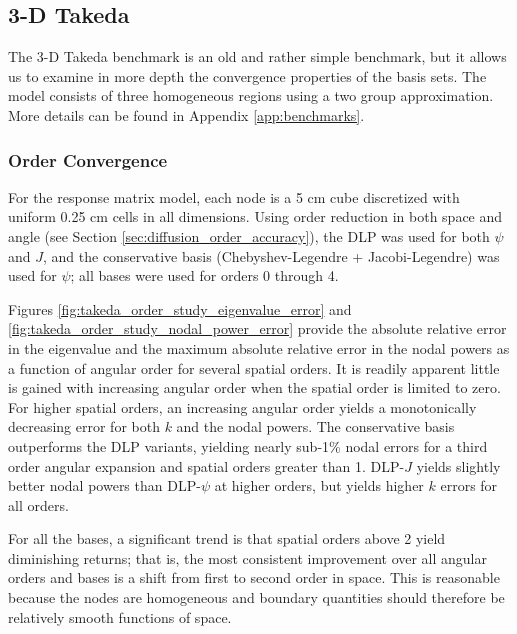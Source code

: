 \subsection{3-D Takeda}

The 3-D Takeda benchmark is an old and rather simple benchmark, but it
allows us to examine in more depth the convergence properties of 
the basis sets.  The model consists of three homogeneous regions using 
a two group approximation.  More details can be found in 
Appendix \ref{app:benchmarks}.

\subsubsection{Order Convergence}

For the response matrix model, each node is a 5 cm cube discretized 
with uniform 0.25 cm cells in all dimensions.  Using order reduction
in both space and angle (see 
Section \ref{sec:diffusion_order_accuracy}), 
the DLP was used for both $\psi$ and $J$, 
and the conservative basis (Chebyshev-Legendre + Jacobi-Legendre) was
used for $\psi$; all
bases were used for orders 0 through 4.

Figures \ref{fig:takeda_order_study_eigenvalue_error} and
\ref{fig:takeda_order_study_nodal_power_error} provide the absolute 
relative error in the eigenvalue and the maximum 
absolute relative error in the nodal powers as a function of angular 
order for several spatial orders.  It is readily apparent little 
is gained with increasing angular order when the spatial order is limited 
to zero.  For higher spatial orders, an increasing angular order 
yields a monotonically decreasing error for both $k$ and the nodal 
powers.  The conservative basis outperforms the DLP variants, yielding
nearly sub-1\% nodal errors for a third order angular expansion and 
spatial orders greater than 1.  DLP-$J$ yields slightly 
better nodal powers than DLP-$\psi$ at higher orders, but yields higher 
$k$ errors for all orders. 

For all the bases, a significant trend is that spatial orders above 
2 yield diminishing returns; that is, the most consistent improvement
over all angular orders and bases is a shift from first to second order 
in space.  This is reasonable because the nodes are homogeneous and 
boundary quantities should therefore be relatively smooth functions of space.

